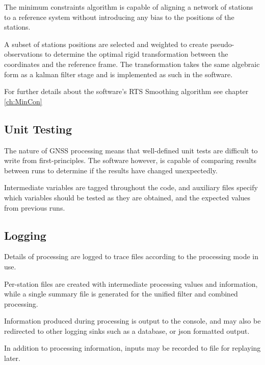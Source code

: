 The minimum constraints algorithm is capable of aligning a network of stations to a reference system without introducing any bias to the positions of the stations.

A subset of stations positions are selected and weighted to create pseudo-observations to determine the optimal rigid transformation between the coordinates and the reference frame. The transformation takes the same algebraic form as a kalman filter stage and is implemented as such in the software.

For further details about the software's RTS Smoothing algorithm see chapter \ref{ch:MinCon}


\subsection{Unit Testing}

The nature of GNSS processing means that well-defined unit tests are difficult to write from first-principles. The software however, is capable of comparing results between runs to determine if the results have changed unexpectedly.

Intermediate variables are tagged throughout the code, and auxiliary files specify which variables should be tested as they are obtained, and the expected values from previous runs.


\subsection{Logging}

Details of processing are logged to trace files according to the processing mode in use.

Per-station files are created with intermediate processing values and information, while a single summary file is generated for the unified filter and combined processing.

Information produced during processing is output to the console, and may also be redirected to other logging sinks such as a database, or json formatted output.

In addition to processing information, inputs may be recorded to file for replaying later.
 
 

 